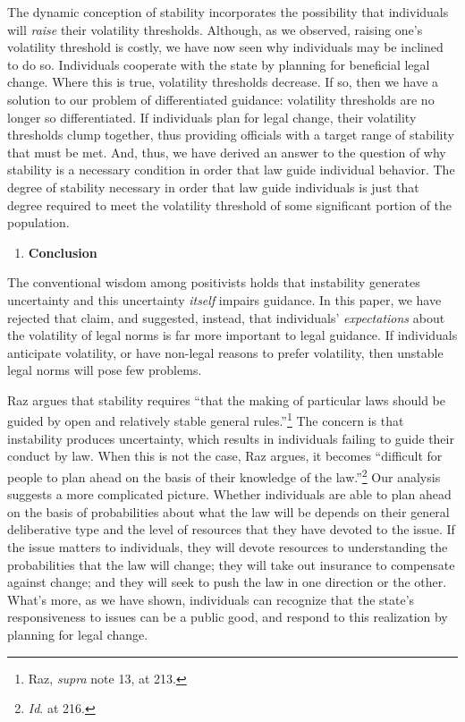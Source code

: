 The dynamic conception of stability incorporates the possibility that
individuals will \emph{raise} their volatility thresholds. Although, as
we observed, raising one's volatility threshold is costly, we have now
seen why individuals may be inclined to do so. Individuals cooperate
with the state by planning for beneficial legal change. Where this is
true, volatility thresholds decrease. If so, then we have a solution to
our problem of differentiated guidance: volatility thresholds are no
longer so differentiated. If individuals plan for legal change, their
volatility thresholds clump together, thus providing officials with a
target range of stability that must be met. And, thus, we have derived
an answer to the question of why stability is a necessary condition in
order that law guide individual behavior. The degree of stability
necessary in order that law guide individuals is just that degree
required to meet the volatility threshold of some significant portion of
the population.

\begin{enumerate}
\def\labelenumi{\arabic{enumi}.}
\item
  \textbf{Conclusion}
\end{enumerate}

The conventional wisdom among positivists holds that instability
generates uncertainty and this uncertainty \emph{itself} impairs
guidance. In this paper, we have rejected that claim, and suggested,
instead, that individuals' \emph{expectations} about the volatility of
legal norms is far more important to legal guidance. If individuals
anticipate volatility, or have non-legal reasons to prefer volatility,
then unstable legal norms will pose few problems.

Raz argues that stability requires ``that the making of particular laws
should be guided by open and relatively stable general
rules.''\footnote{Raz, \emph{supra} note 13, at 213.} The concern is
that instability produces uncertainty, which results in individuals
failing to guide their conduct by law. When this is not the case, Raz
argues, it becomes ``difficult for people to plan ahead on the basis of
their knowledge of the law.''\footnote{\emph{Id}. at 216.} Our analysis
suggests a more complicated picture. Whether individuals are able to
plan ahead on the basis of probabilities about what the law will be
depends on their general deliberative type and the level of resources
that they have devoted to the issue. If the issue matters to
individuals, they will devote resources to understanding the
probabilities that the law will change; they will take out insurance to
compensate against change; and they will seek to push the law in one
direction or the other. What's more, as we have shown, individuals can
recognize that the state's responsiveness to issues can be a public
good, and respond to this realization by planning for legal change.

